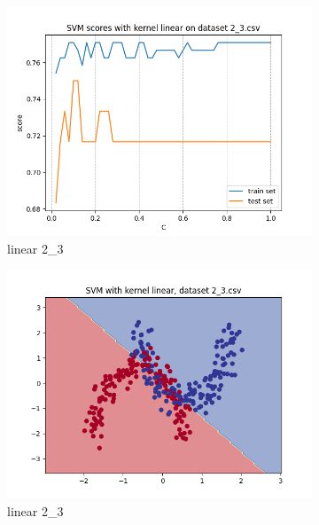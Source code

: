 \documentclass[12pt]{article}
\newcommand*{\subfigwidth}{0.24\textwidth}
\begin{document}
\begin{figure}[H]
\begin{subfigure}[t]{\subfigwidth}
        \includegraphics[width=\linewidth]{img/exp_1/svm/2_3/linear/scores.png}
        \caption{linear 2\_3}
    \end{subfigure}
    \hfill
    \begin{subfigure}[t]{\subfigwidth}
        \includegraphics[width=\linewidth]{img/exp_1/svm/2_3/linear/boundary.png}
        \caption{linear 2\_3}
    \end{subfigure}
    \hfill
    \begin{subfigure}[t]{\subfigwidth}

\end{subfigure}
\end{figure}
\end{document}
